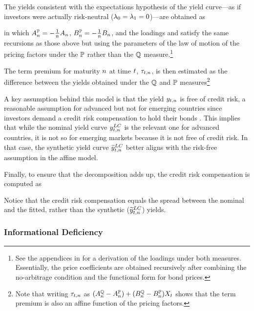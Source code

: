 {The yields consistent with the expectations hypothesis of the yield curve---as if investors were actually risk-neutral (\(\lambda_{0} = \lambda_{1} = 0\))---are obtained as
	
\noindent in which \(A_{n}^{\mathbb{P}} = - \frac{1}{n} A_{n}\), \(B_{n}^{\mathbb{P}} = - \frac{1}{n} B_{n}\), and the loadings  and  satisfy the same recursions as those above but using the parameters of the law of motion of the pricing factors under the \(\mathbb{P}\) rather than the \(\mathbb{Q}\) measure.\footnote{ See the appendices in \cite{Lloyd:2020} for a derivation of the loadings under both measures. Essentially, the price coefficients are obtained recursively after combining the no-arbitrage condition and the functional form for bond prices.}

The term premium for maturity \(n\) at time \(t\), \(\tau_{t,n}\), is then estimated as the difference between the yields obtained under the \(\mathbb{Q}\) and \(\mathbb{P}\) measures\footnote{ Note that writing \(\tau_{t,n}\) as \( (A_{n}^{\mathbb{Q}} - A_{n}^{\mathbb{P}}) + (B_{n}^{\mathbb{Q}}  - B_{n}^{\mathbb{P}}) X_{t} \) shows that the term premium is also an affine function of the pricing factors.}
	
A key assumption behind this model is that the yield \(y_{t,n}\) is free of credit risk, a reasonable assumption for advanced but not for emerging countries since investors demand a credit risk compensation to hold their bonds \citep{DuSchreger:2016JoF}. 
This implies that while the nominal yield curve \(y_{t,n} ^{LC}\) is the relevant one for advanced countries, it is not so for emerging markets because it is not free of credit risk.
In that case, the synthetic yield curve \(\widetilde{y}_{t,n} ^{LC}\) better aligns with the risk-free assumption in the affine model.

Finally, to ensure that the decomposition adds up, the credit risk compensation is computed as
	
\noindent Notice that the credit risk compensation equals the spread between the nominal 
and the fitted, rather than the synthetic (\(\widetilde{y}_{t,n} ^{LC}\)) yields. %

\subsubsection{Informational Deficiency} \label{sec:Identification}
\iftoggle{toclinks}{\gototoc}{} %

}
